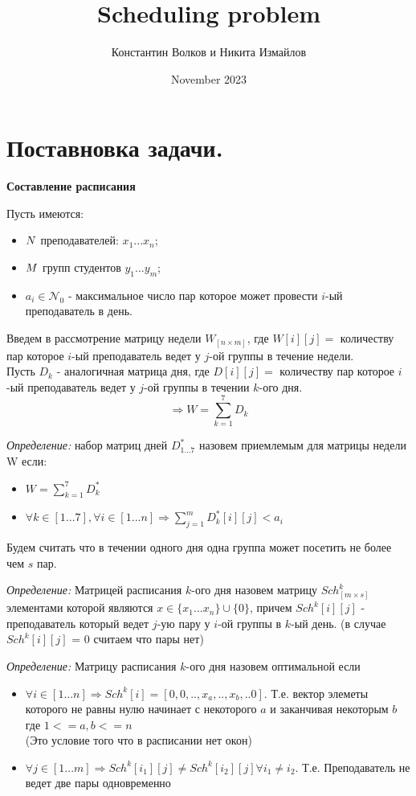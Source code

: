 \documentclass{article}
\title{Scheduling problem}
\author{Константин Волков и Никита Измайлов}
\date{November 2023}
\begin{document}
\maketitle


\section{Поставновка задачи.} 
\textbf{Составление расписания}

Пусть имеются: \par
\begin{itemize}
\item \(\mathnormal{N}\) преподавателей: \(x_1  ...  x_n \);
\item \(\mathnormal{M}\) групп студентов \(y_1  ...  y_m \);
\item \(a_i \in \mathcal{N}_0\) - максимальное число пар которое может провести \(i\)-ый преподаватель в день.
\end{itemize}

Введем в рассмотрение матрицу недели \(W_{[n \times m]}\), где \(W[i][j] = \) количеству пар которое \(i\)-ый преподаватель ведет у \(j\)-ой группы в течение недели. \\
Пусть \(D_k\) - аналогичная матрица дня, где  \(D[i][j] = \) количеству пар которое \(i\)-ый преподаватель ведет у \(j\)-ой группы в течении \(k\)-ого дня. \\
\[\Rightarrow W = \sum_{k=1}^{7} D_k\]

\textit{Определение:} набор матриц дней \(D_{1...7}^{*}\) назовем приемлемым для матрицы недели W если:
\begin{itemize}
\item \(W = \sum_{k=1}^{7} D_k^{*}\)
\item \(\forall k \in [1...7], \forall i \in [1...n] \Rightarrow \sum_{j = 1}^{m} D_k^{*}[i][j] < a_i \)
\end{itemize}
Будем считать что в течении одного дня одна группа может посетить не более чем \(s\) пар.

\par
\textit{Определение:} Матрицей расписания \(k\)-ого дня назовем матрицу \(Sch_{[m \times s]}^{k}\) элементами которой являются \(x \in \{x_1...x_n\} \cup \{0\}\), причем \(Sch^{k}[i][j]\) - преподаватель который ведет \(j\)-ую пару у \(i\)-ой группы в \(k\)-ый день. (в случае  \(Sch^{k}[i][j]\) = \(0\) считаем что пары нет)
\par
\textit{Определение:} Матрицу расписания \(k\)-ого дня назовем оптимальной если 
\begin{itemize}
    \item \(\forall i \in [1...n] \Rightarrow Sch^{k}[i] = [0, 0, .., x_a, .., x_b,.. 0]\). Т.е. вектор элеметы которого не равны нулю начинает с некоторого \(a\) и заканчивая некоторым \(b\) где \(1 <= a, b <= n\) \\ (Это условие того что в расписании нет окон)
     \item \(\forall  j \in [1...m] \Rightarrow Sch^{k}[i_1][j] \neq Sch^{k}[i_2][j] \forall i_1 \neq i_2 \). Т.е. Преподаватель не ведет две пары одновременно
\end{itemize}
\end{document}
